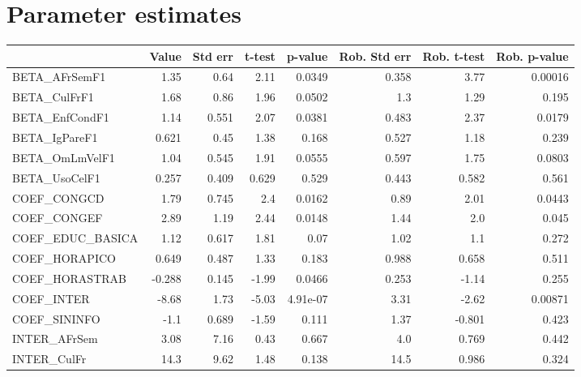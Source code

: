 \section{Parameter estimates}
\begin{tabular}{lrrrrrrr}
\toprule
{} &  Value &  Std err &  t-test &  p-value &  Rob. Std err &  Rob. t-test &  Rob. p-value \\
\midrule
BETA\_AFrSemF1      &   1.35 &     0.64 &    2.11 &   0.0349 &         0.358 &         3.77 &       0.00016 \\
BETA\_CulFrF1       &   1.68 &     0.86 &    1.96 &   0.0502 &           1.3 &         1.29 &         0.195 \\
BETA\_EnfCondF1     &   1.14 &    0.551 &    2.07 &   0.0381 &         0.483 &         2.37 &        0.0179 \\
BETA\_IgPareF1      &  0.621 &     0.45 &    1.38 &    0.168 &         0.527 &         1.18 &         0.239 \\
BETA\_OmLmVelF1     &   1.04 &    0.545 &    1.91 &   0.0555 &         0.597 &         1.75 &        0.0803 \\
BETA\_UsoCelF1      &  0.257 &    0.409 &   0.629 &    0.529 &         0.443 &        0.582 &         0.561 \\
COEF\_CONGCD        &   1.79 &    0.745 &     2.4 &   0.0162 &          0.89 &         2.01 &        0.0443 \\
COEF\_CONGEF        &   2.89 &     1.19 &    2.44 &   0.0148 &          1.44 &          2.0 &         0.045 \\
COEF\_EDUC\_BASICA   &   1.12 &    0.617 &    1.81 &     0.07 &          1.02 &          1.1 &         0.272 \\
COEF\_HORAPICO      &  0.649 &    0.487 &    1.33 &    0.183 &         0.988 &        0.658 &         0.511 \\
COEF\_HORASTRAB     & -0.288 &    0.145 &   -1.99 &   0.0466 &         0.253 &        -1.14 &         0.255 \\
COEF\_INTER         &  -8.68 &     1.73 &   -5.03 & 4.91e-07 &          3.31 &        -2.62 &       0.00871 \\
COEF\_SININFO       &   -1.1 &    0.689 &   -1.59 &    0.111 &          1.37 &       -0.801 &         0.423 \\
INTER\_AFrSem       &   3.08 &     7.16 &    0.43 &    0.667 &           4.0 &        0.769 &         0.442 \\
INTER\_CulFr        &   14.3 &     9.62 &    1.48 &    0.138 &          14.5 &        0.986 &         0.324 \\

\end{tabular}
